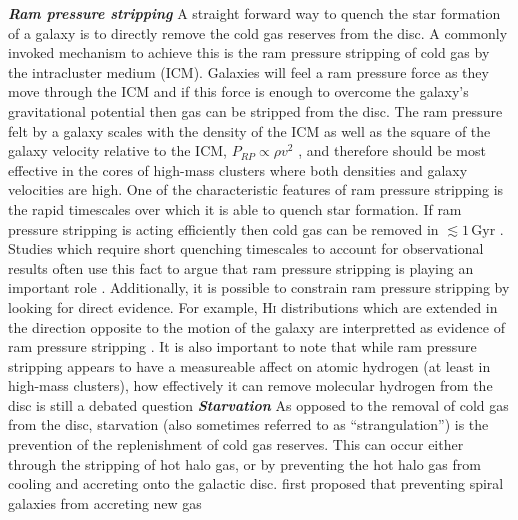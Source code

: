 \noindent \textit{\textbf{Ram pressure stripping}}
\smallskip
\newline
A straight forward way to quench the star formation of a galaxy
is to directly remove the cold gas reserves from the disc.  A commonly invoked
mechanism to achieve this is the ram pressure stripping of cold gas by the
intracluster medium (ICM).  Galaxies will feel a ram pressure force as
they move through the ICM and if this force is enough to overcome the
galaxy's gravitational potential then gas can be stripped from the
disc.  The ram pressure felt by a galaxy scales with the density of
the ICM as well as the square of the galaxy velocity relative to the ICM,
$P_{RP} \propto \rho v^2$ \citep{gunn1972}, and therefore should be
most effective in the cores of high-mass clusters where both densities
and galaxy velocities are high.  One of the characteristic
features of ram pressure stripping is the rapid timescales over which
it is able to quench star formation.  If ram pressure stripping is
acting efficiently then cold gas can be removed in $\lesssim
\! 1\,\mathrm{Gyr}$ \citep{abadi1999, quilis2000, roediger2005,
  steinhauser2016}.  Studies which require short
quenching timescales to account for observational results often use
this fact to argue that ram pressure stripping is playing an important
role \citep{muzzin2014, fillingham2015, wetzel2015}.  Additionally, it
is possible to constrain ram
pressure stripping by looking for direct evidence.  For example,
H\textsc{i} distributions which are extended in the direction opposite
to the motion of the galaxy are interpretted as evidence of ram
pressure stripping \citep{kenney2004, chung2007,
  chung2009, kenney2015}.  It is also important to note that while
ram pressure stripping appears to have a measureable affect on atomic
hydrogen (at least in high-mass clusters), how
effectively it can remove molecular hydrogen from the disc is still a
debated question \citep{boselli2002, boselli2006, fumagalli2009,
  sivanandam2014} \vspace{1em} \newline
\noindent \textit{\textbf{Starvation}}
\smallskip
\newline
As opposed to the removal of cold gas from the disc, starvation (also
sometimes referred to as ``strangulation'') is the prevention of the
replenishment of cold gas reserves.  This can occur either through the
stripping of hot halo gas, or by preventing the hot halo gas from
cooling and accreting onto the galactic disc.  \citet{larson1980}
first proposed that preventing spiral galaxies from accreting new gas
